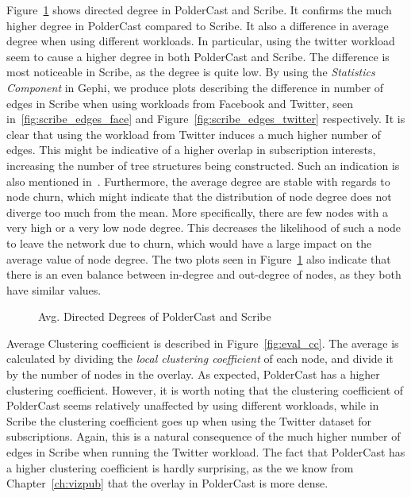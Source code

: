 Figure~\ref{fig:eval_directeddegree} shows directed degree in PolderCast
and Scribe. It confirms the much higher degree in PolderCast compared to
Scribe. It also a difference in average degree when using different
workloads. In particular, using the twitter workload seem to cause a
higher degree in both PolderCast and Scribe.  The difference is most
noticeable in Scribe, as the degree is quite low.  By using the
\emph{Statistics Component} in Gephi, we produce plots describing the
difference in number of edges in Scribe when using workloads from
Facebook and Twitter, seen in~\ref{fig:scribe_edges_face} and
Figure~\ref{fig:scribe_edges_twitter} respectively. It is clear that
using the workload from Twitter induces a much higher number of edges.
This might be indicative of a higher overlap in subscription interests,
increasing the number of tree structures being constructed. Such an
indication is also mentioned in~\cite{Setty:2012}. Furthermore, the
average degree are stable with regards to node churn, which might
indicate that the distribution of node degree does not diverge too much
from the mean. More specifically, there are few nodes with a very high
or a very low node degree. This decreases the likelihood of such a node
to leave the network due to churn, which would have a large impact on
the average value of node degree. The two plots seen in
Figure~\ref{fig:eval_directeddegree} also indicate that there is an even
balance between in-degree and out-degree of nodes, as they both have
similar values.

\begin{figure}[H]
    \centering
        
        \label{fig:eval_indegree}
        
        \label{fig:eval_outdegree}
    \caption{Avg. Directed Degrees of PolderCast and Scribe}
    \label{fig:eval_directeddegree}
\end{figure}



Average Clustering coefficient is described in Figure~\ref{fig:eval_cc}.
The average is calculated by dividing the \emph{local clustering
    coefficient} of each node, and divide it by the number of nodes in
the overlay. As expected, PolderCast has a higher clustering
coefficient. However, it is worth noting that the clustering coefficient
of PolderCast seems relatively unaffected by using different workloads,
while in Scribe the clustering coefficient goes up when using the
Twitter dataset for subscriptions. Again, this is a natural consequence
of the much higher number of edges in Scribe when running the Twitter
workload. The fact that PolderCast has a higher clustering coefficient
is hardly surprising, as the we know from Chapter~\ref{ch:vizpub} that
the overlay in PolderCast is more dense.

